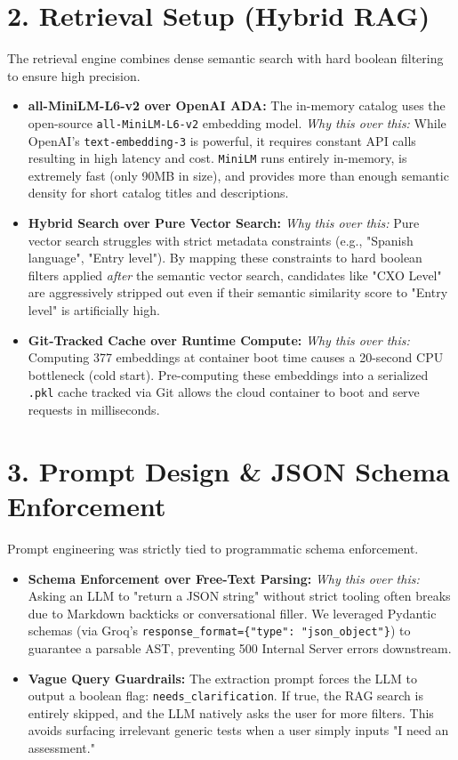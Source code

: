 \documentclass[11pt,a4paper]{article}
\begin{document}
\section{2. Retrieval Setup (Hybrid RAG)}
The retrieval engine combines dense semantic search with hard boolean filtering to ensure high precision.
\begin{itemize}[leftmargin=*, noitemsep]
    \item \textbf{all-MiniLM-L6-v2 over OpenAI ADA:} The in-memory catalog uses the open-source \texttt{all-MiniLM-L6-v2} embedding model. \textit{Why this over this:} While OpenAI's \texttt{text-embedding-3} is powerful, it requires constant API calls resulting in high latency and cost. \texttt{MiniLM} runs entirely in-memory, is extremely fast (only 90MB in size), and provides more than enough semantic density for short catalog titles and descriptions.
    \item \textbf{Hybrid Search over Pure Vector Search:} \textit{Why this over this:} Pure vector search struggles with strict metadata constraints (e.g., "Spanish language", "Entry level"). By mapping these constraints to hard boolean filters applied \textit{after} the semantic vector search, candidates like "CXO Level" are aggressively stripped out even if their semantic similarity score to "Entry level" is artificially high.
    \item \textbf{Git-Tracked Cache over Runtime Compute:} \textit{Why this over this:} Computing 377 embeddings at container boot time causes a 20-second CPU bottleneck (cold start). Pre-computing these embeddings into a serialized \texttt{.pkl} cache tracked via Git allows the cloud container to boot and serve requests in milliseconds.
\end{itemize}

\section{3. Prompt Design \& JSON Schema Enforcement}
Prompt engineering was strictly tied to programmatic schema enforcement.
\begin{itemize}[leftmargin=*, noitemsep]
    \item \textbf{Schema Enforcement over Free-Text Parsing:} \textit{Why this over this:} Asking an LLM to "return a JSON string" without strict tooling often breaks due to Markdown backticks or conversational filler. We leveraged Pydantic schemas (via Groq's \texttt{response\_format=\{"type": "json\_object"\}}) to guarantee a parsable AST, preventing 500 Internal Server errors downstream.
    \item \textbf{Vague Query Guardrails:} The extraction prompt forces the LLM to output a boolean flag: \texttt{needs\_clarification}. If true, the RAG search is entirely skipped, and the LLM natively asks the user for more filters. This avoids surfacing irrelevant generic tests when a user simply inputs "I need an assessment."
\end{itemize}
\end{document}

